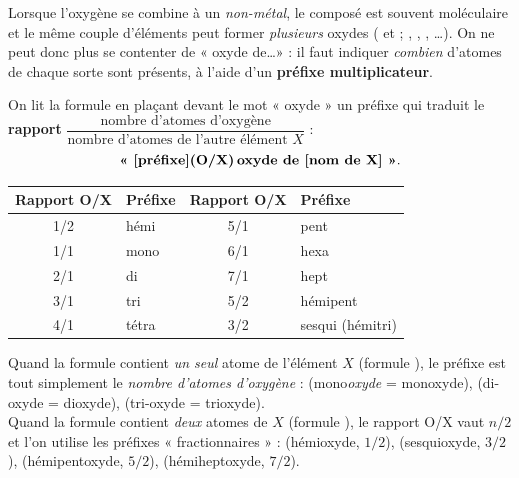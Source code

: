 \documentclass[11pt,a4paper]{article}
\begin{document}
Lorsque l'oxygène se combine à un \emph{non-métal}, le composé est souvent moléculaire et le même couple
d'éléments peut former \emph{plusieurs} oxydes ( et  ; , , ,
\ldots). On ne peut donc plus se contenter de « oxyde de\ldots » : il faut indiquer
\emph{combien} d'atomes de chaque sorte sont présents, à l'aide d'un \textbf{préfixe multiplicateur}.

\begin{regle}
On lit la formule en plaçant devant le mot « oxyde » un préfixe qui traduit le \textbf{rapport}
$\dfrac{\text{nombre d'atomes d'oxygène}}{\text{nombre d'atomes de l'autre élément } X}$ :
\[ \textbf{« [préfixe](O/X)\,oxyde de [nom de X] »}. \]
\end{regle}

\begin{center}
\renewcommand{\arraystretch}{1.15}
\begin{tabular}{cl@{\qquad}cl}
\rowcolor{nonmetcol!22}
\textbf{Rapport O/X} & \textbf{Préfixe} & \textbf{Rapport O/X} & \textbf{Préfixe} \\
\midrule
1/2 & hémi    & 5/1 & pent \\
1/1 & mono    & 6/1 & hexa \\
2/1 & di      & 7/1 & hept \\
3/1 & tri     & 5/2 & hémipent \\
4/1 & tétra   & 3/2 & sesqui (hémitri) \\
\bottomrule
\end{tabular}
\end{center}

\begin{remarque}
Quand la formule contient \emph{un seul} atome de l'élément $X$ (formule ), le préfixe est tout
simplement le \emph{nombre d'atomes d'oxygène} :  (mono\emph{oxyde} = monoxyde), 
(di-oxyde = dioxyde),  (tri-oxyde = trioxyde). \\
Quand la formule contient \emph{deux} atomes de $X$ (formule ), le rapport O/X vaut $n/2$ et l'on
utilise les préfixes « fractionnaires » :  (hémioxyde, $1/2$),  (sesquioxyde, $3/2$),
 (hémipentoxyde, $5/2$),  (hémiheptoxyde, $7/2$).
\end{remarque}
\end{document}

